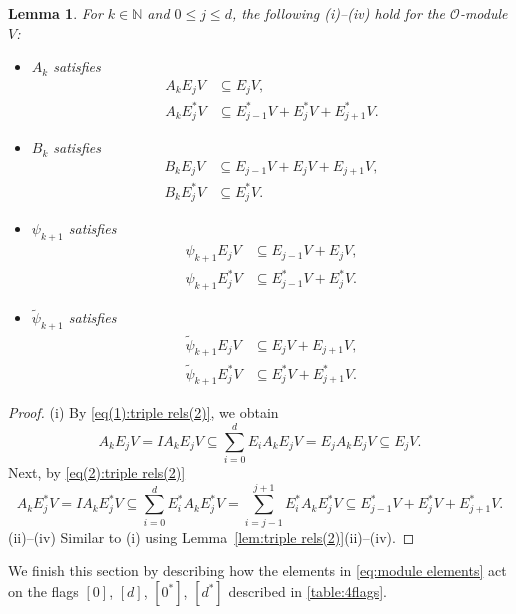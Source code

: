 \documentclass[11pt]{article}%
\theoremstyle{definition}
\theoremstyle{plain}
\newtheorem{lemma}[definition]{Lemma}
\begin{document}
\begin{lemma}\label{lem:act.alt.elts}
For $k \in \mathbb{N}$ and $0 \leq j \leq d$, the following {\rm(i)}--{\rm(iv)} hold for the $\mathcal{O}$-module $V$:

\begin{itemize}
\item[\rm(i)] $A_k$ satisfies
	\begin{align*}
		A_kE_jV & \subseteq E_jV, \\
		A_kE_j^*V & \subseteq E_{j-1}^*V + E_j^*V + E_{j+1}^*V.
	\end{align*}
\item[\rm(ii)] $B_k$ satisfies
	\begin{align*}
		B_kE_jV & \subseteq E_{j-1}V + E_jV + E_{j+1}V, \\
		B_kE_j^*V & \subseteq E_j^*V.
	\end{align*}
\item[\rm(iii)] $\psi_{k+1}$ satisfies
	\begin{align*}
		\psi_{k+1} E_jV & \subseteq E_{j-1}V + E_jV, \\
		\psi_{k+1} E_j^*V & \subseteq E_{j-1}^*V + E_j^*V.
	\end{align*}	
\item[\rm(iv)] $\tilde\psi_{k+1}$ satisfies
	\begin{align*}
		\tilde\psi_{k+1} E_j V & \subseteq E_j V + E_{j+1} V, \\
		\tilde\psi_{k+1} E_j^* V& \subseteq E_j^* V + E_{j+1}^* V.
	\end{align*}	
\end{itemize}
\end{lemma}
\begin{proof}
(i) By \eqref{eq(1):triple rels(2)}, we obtain
$$
	A_k E_j V = I A_k E_j V \subseteq \sum_{i=0}^d E_i A_k E_j V = E_j A_k E_j V \subseteq E_jV.
$$
Next, by \eqref{eq(2):triple rels(2)}
$$
	A_k E_j^* V = I A_k E_j^* V \subseteq \sum_{i=0}^d E_i^* A_k E_j^* V = \sum_{i=j-1}^{j+1} E_i^* A_k E_j^* V \subseteq E_{j-1}^*V + E_{j}^*V + E_{j+1}^*V.
$$
(ii)--(iv) Similar to (i) using Lemma~\ref{lem:triple rels(2)}(ii)--(iv).
\end{proof}

We finish this section by describing how the elements in \eqref{eq:module elements} act on the flags $[0]$, $[d]$, $[0^*]$, $[d^*]$ described in \eqref{table:4flags}.
\end{document}
